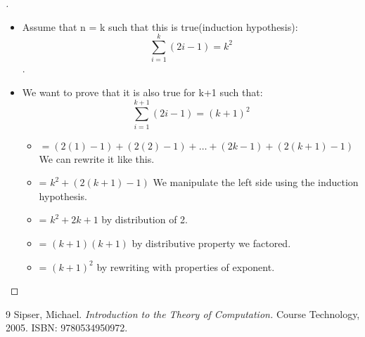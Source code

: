 \documentclass[12pt]{article}
\newenvironment{exercise}[2][Exercise]{\begin{trivlist}
\item[\hskip \labelsep {\bfseries #1}\hskip \labelsep {\bfseries #2.}]}{\end{trivlist}}
\newenvironment{solution}[1][{\color{red} Solution:}]{\begin{trivlist}
\item[\hskip \labelsep {\bfseries #1}\hskip \labelsep {\bfseries}]}{\end{trivlist}}
\begin{document}
\begin{exercise}{4}
\begin{enumerate}[(a)]
\begin{solution}
\begin{proof}[\unskip\nopunct]
\begin{itemize}
               \item Assume that n = k such that this is true(induction hypothesis): $$\sum^{k}_{i=1}(2i - 1) = k^2$$. 
                \item We want to prove that it is also true for k+1 such that: $$\sum^{k+1}_{i=1}(2i - 1) = (k+1)^2$$
                    \begin{itemize}[label=]
                        \item $ = (2(1)-1) + (2(2)-1) + \dots + (2k-1) + (2(k+1)-1) $ We can rewrite it like this. 
                        \item = $k^2 + (2(k+1)-1)$ We manipulate the left side using the induction hypothesis.
                        \item = $k^2 + 2k + 1$ by distribution of 2. 
                        \item = $(k+1)(k+1)$ by distributive property we factored. 
                        \item = $(k+1)^2$ by rewriting with properties of exponent. 
                    \end{itemize}
            \end{itemize}
            
        \end{proof}
    \end{solution}
        
\end{enumerate}        
\end{exercise}

\vfill

\begin{thebibliography}{9}
Sipser, Michael. 
\textit{Introduction to the Theory of Computation.} 
Course Technology, 2005. ISBN: 9780534950972. 

\end{thebibliography}

 
\end{document}
